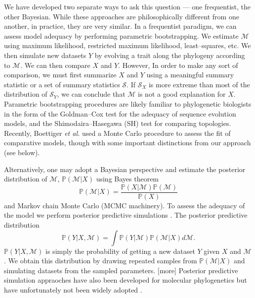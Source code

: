 \documentclass[a4paper,12pt]{article}
\begin{document}
We have developed two separate ways to ask this question --- one frequentist, the other Bayesian. While these approaches are philosophically different from one another, in practice, they are very similar. In a frequentist paradigm, we can assess model adequacy by performing parametric bootstrapping. We estimate $\mathcal{M}$ using maximum likelihood, restricted maximum likelihood, least--squares, etc. We then simulate new datasets $Y$ by evolving a trait along the phylogeny according to $\mathcal{M}$. We can then compare $X$ and $Y$. However, In order to make any sort of comparison, we must first summarize $X$ and $Y$ using a meaningful summary statistic or a set of summary statistics $\mathcal{S}$. If $\mathcal{S}_X$ is more extreme than most of the distribution of $\mathcal{S}_Y$, we can conclude that $\mathcal{M}$ is not a good explanation for $X$. Parametric bootstrapping procedures are likely familiar to phylogenetic biologists in the form of the Goldman--Cox test \citep{Goldman1993} for the adequacy of sequence evolution models, and the Shimodaira--Hasegawa (SH) \citep{SH} test for comparing topologies. Recently, Boettiger \textit{et al.} \citep{Boettiger2012} used a Monte Carlo procedure to assess the fit of comparative models, though with some important distinctions from our approach (see below).

Alternatively, one may adopt a Bayesian perspective and estimate the posterior distribution of $\mathcal{M}$, $\mathbb{P}(\mathcal{M}|X)$ using Bayes theorem
\[\mathbb{P}(\mathcal{M}|X) = \frac{\mathbb{P}(X|\mathcal{M})\mathbb{P}(\mathcal{M})}{\mathbb{P}(X)} \]
and Markov chain Monte Carlo (MCMC machinery). To assess the adequacy of the model we perform posterior predictive simulations \citep{Rubin1984, Gelman1996}. The posterior predictive distribution
\[\mathbb{P}(Y|X,\mathcal{M}) = \int \mathbb{P}(Y|\mathcal{M})\mathbb{P}(\mathcal{M}|X)d\mathcal{M}. \]
$\mathbb{P}(Y|X,\mathcal{M})$ is simply the probability of getting a new dataset $Y$ given $X$ and $\mathcal{M}$. We obtain this distribution by drawing repeated samples from $\mathbb{P}(\mathcal{M}|X)$ and simulating datasets from the sampled parameters. [more] Posterior predictive simulation appraoches have also been developed for molecular phylogenetics \citep{Bollback2002, Reid2013, Lewis2013, Brown2013} but have unfortunately not been widely adopted \citep{Brown2013}.
\end{document}
